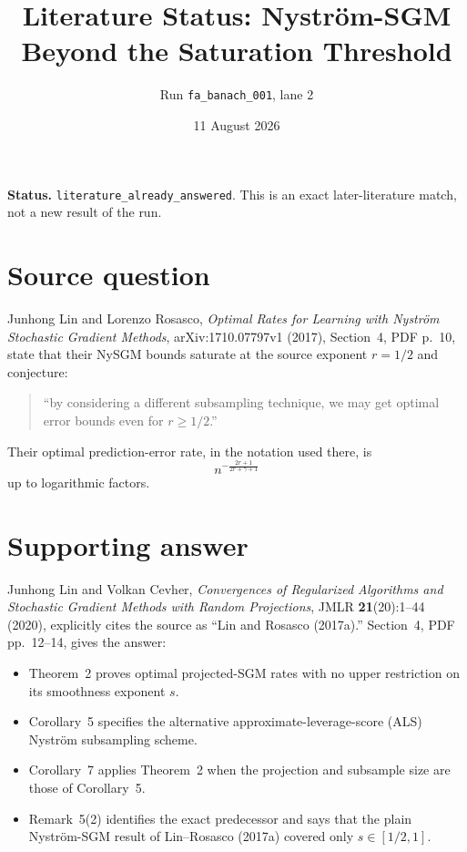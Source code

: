 \documentclass[11pt]{article}
\title{Literature Status: Nystr\"om-SGM Beyond the Saturation Threshold}
\author{Run \texttt{fa\_banach\_001}, lane 2}
\date{11 August 2026}
\begin{document}
\maketitle

\textbf{Status.} \texttt{literature\_already\_answered}.  This is an exact
later-literature match, not a new result of the run.

\section*{Source question}

Junhong Lin and Lorenzo Rosasco, \emph{Optimal Rates for Learning with
Nystr\"om Stochastic Gradient Methods}, arXiv:1710.07797v1 (2017), Section~4,
PDF p.~10, state that their NySGM bounds saturate at the source exponent
$r=1/2$ and conjecture:

\begin{quote}
``by considering a different subsampling technique, we may get optimal error
bounds even for $r\geq 1/2$.''
\end{quote}

Their optimal prediction-error rate, in the notation used there, is
\[
 n^{-\frac{2r+1}{2r+\gamma+1}}
\]
up to logarithmic factors.

\section*{Supporting answer}

Junhong Lin and Volkan Cevher, \emph{Convergences of Regularized Algorithms
and Stochastic Gradient Methods with Random Projections}, JMLR
\textbf{21}(20):1--44 (2020), explicitly cites the source as ``Lin and
Rosasco (2017a).''  Section~4, PDF pp.~12--14, gives the answer:

\begin{itemize}
\item Theorem~2 proves optimal projected-SGM rates with no upper restriction
on its smoothness exponent $s$.
\item Corollary~5 specifies the alternative approximate-leverage-score (ALS)
Nystr\"om subsampling scheme.
\item Corollary~7 applies Theorem~2 when the projection and subsample size are
those of Corollary~5.
\item Remark~5(2) identifies the exact predecessor and says that the plain
Nystr\"om-SGM result of Lin--Rosasco (2017a) covered only
$s\in[1/2,1]$.
\end{itemize}
\end{document}
